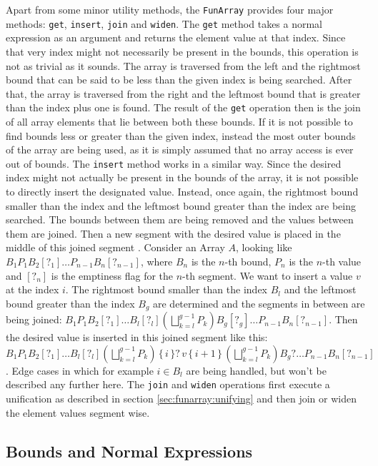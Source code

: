 \documentclass{report}
\begin{document}
Apart from some minor utility methods, the \texttt{FunArray} provides four major methods: \texttt{get}, \texttt{insert}, \texttt{join} and \texttt{widen}. The \texttt{get} method takes a normal expression as an argument and returns the element value at that index. Since that very index might not necessarily be present in the bounds, this operation is not as trivial as it sounds. The array is traversed from the left and the rightmost bound that can be said to be less than the given index is being searched. After that, the array is traversed from the right and the leftmost bound that is greater than the index plus one is found. The result of the \texttt{get} operation then is the join of all array elements that lie between both these bounds. If it is not possible to find bounds less or greater than the given index, instead the most outer bounds of the array are being used, as it is simply assumed that no array access is ever out of bounds. The \texttt{insert} method works in a similar way. Since the desired index might not actually be present in the bounds of the array, it is not possible to directly insert the designated value. Instead, once again, the rightmost bound smaller than the index and the leftmost bound greater than the index are being searched. The bounds between them are being removed and the values between them are joined. Then a new segment with the desired value is placed in the middle of this joined segment \cite{cousot2011} . Consider an Array $A$, looking like $B_1P_1B_2[?_1]\ldots P_{n-1}B_n[?_{n-1}]$, where $B_n$ is the $n$-th bound, $P_n$ is the $n$-th value and $[?_{n}]$ is the emptiness flag for the $n$-th segment. We want to insert a value $v$ at the index $i$. The rightmost bound smaller than the index $B_l$ and the leftmost bound greater than the index $B_g$ are determined and the segments in between are being joined: $B_1P_1B_2[?_1]\ldots B_l[?_l] (\bigsqcup^{g-1}_{k=l}P_k) B_g[?_g]\ldots P_{n-1}B_n[?_{n-1}]$. Then the desired value  is inserted in this joined segment like this: $B_1P_1B_2[?_1]\ldots\allowbreak B_l[?_l] (\bigsqcup^{g-1}_{k=l}P_k)\allowbreak\, \{\,i\,\}?\, v \,\{\,i+1\,\}\, \allowbreak(\bigsqcup^{g-1}_{k=l}P_k) B_g?\ldots \allowbreak P_{n-1}B_n[?_{n-1}]$. Edge cases in which for example $i\in B_l$ are being handled, but won't be described any further here. The \texttt{join} and \texttt{widen} operations first execute a unification as described in section \ref{sec:funarray:unifying} and then join or widen the element values segment wise.

\subsection{Bounds and Normal Expressions}
\end{document}

